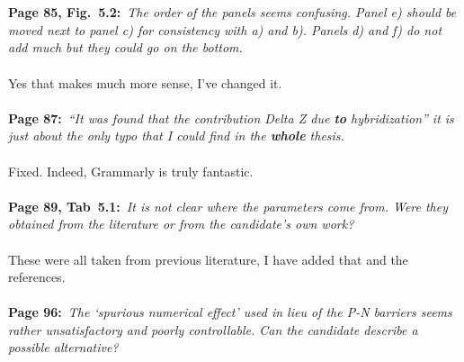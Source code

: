 \documentclass[a4, UTF8]{article}
\begin{document}
\\\\
{\bf Page 85, Fig.~5.2:}~{\it The order of the panels seems confusing. Panel e) should be moved next to
panel c) for consistency with a) and b). Panels d) and f) do not add much but they could go on the
bottom.}
\\\\
Yes that makes much more sense, I've changed it.
\\\\
{\bf Page 87:}~{\it ``It was found that the contribution Delta Z due {\bf to} hybridization'' it is just about the only typo that I could find in the {\bf whole} thesis.}
\\\\
Fixed. Indeed, Grammarly is truly fantastic.
\\\\
{\bf Page 89, Tab~5.1:}~{\it It is not clear where the parameters come from. Were they obtained from the literature or from the candidate’s own work?}
\\\\
These were all taken from previous literature, I have added that and the references.
\\\\
{\bf Page 96:}~{\it The `spurious numerical effect' used in lieu of the P-N barriers seems rather
unsatisfactory and poorly controllable. Can the candidate describe a possible alternative?}
\\\\
\end{document}
